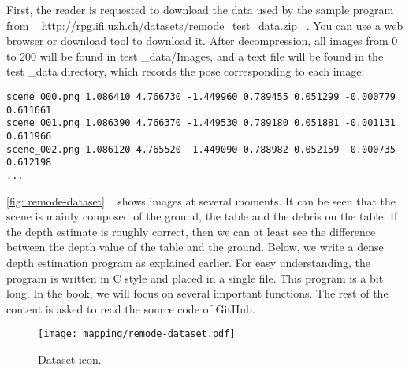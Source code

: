 First, the reader is requested to download the data used by the sample program from ~ \url{http://rpg.ifi.uzh.ch/datasets/remode_test_data.zip} ~. You can use a web browser or download tool to download it. After decompression, all images from 0 to 200 will be found in test \_data/Images, and a text file will be found in the test \_data directory, which records the pose corresponding to each image:
\begin{lstlisting}
scene_000.png 1.086410 4.766730 -1.449960 0.789455 0.051299 -0.000779 0.611661
scene_001.png 1.086390 4.766370 -1.449530 0.789180 0.051881 -0.001131 0.611966
scene_002.png 1.086120 4.765520 -1.449090 0.788982 0.052159 -0.000735 0.612198
...
\end{lstlisting}

\autoref{fig: remode-dataset} ~ shows images at several moments. It can be seen that the scene is mainly composed of the ground, the table and the debris on the table. If the depth estimate is roughly correct, then we can at least see the difference between the depth value of the table and the ground. Below, we write a dense depth estimation program as explained earlier. For easy understanding, the program is written in C style and placed in a single file. This program is a bit long. In the book, we will focus on several important functions. The rest of the content is asked to read the source code of GitHub.

\begin{figure}[! ht]
\centering
\texttt{[image: mapping/remode-dataset.pdf]}
\caption{Dataset icon. }
\label{fig: remode-dataset}
\end{figure}

